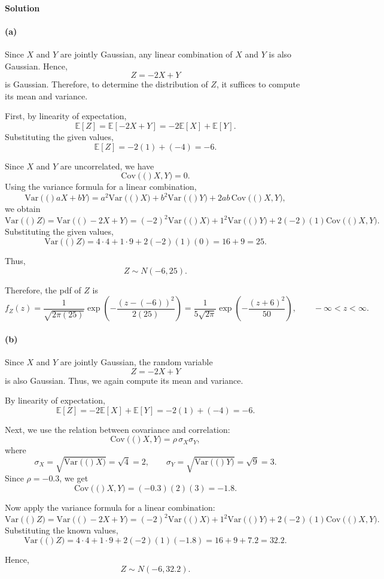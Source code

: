 \documentclass[a4paper,10pt]{article}
\newcommand{\Var}[1]{\text{Var}\left(#1\right)} %
\newcommand{\Cov}[1]{\text{Cov}\left(#1\right)} %
\begin{document}
\paragraph{Solution}
\paragraph{(a)}
Since $X$ and $Y$ are jointly Gaussian, any linear combination of $X$ and $Y$ is also Gaussian. Hence,
\[
Z=-2X+Y
\]
is Gaussian. Therefore, to determine the distribution of $Z$, it suffices to compute its mean and variance.

First, by linearity of expectation,
\[
\mathbb{E}[Z]=\mathbb{E}[-2X+Y]
=-2\mathbb{E}[X]+\mathbb{E}[Y].
\]
Substituting the given values,
\[
\mathbb{E}[Z]=-2(1)+(-4)=-6.
\]

Since $X$ and $Y$ are uncorrelated, we have
\[
\Cov(X,Y)=0.
\]
Using the variance formula for a linear combination,
\[
\Var(aX+bY)=a^2\Var(X)+b^2\Var(Y)+2ab\,\Cov(X,Y),
\]
we obtain
\[
\Var(Z)=\Var(-2X+Y)
=(-2)^2\Var(X)+1^2\Var(Y)+2(-2)(1)\Cov(X,Y).
\]
Substituting the given values,
\[
\Var(Z)=4\cdot 4+1\cdot 9+2(-2)(1)(0)=16+9=25.
\]

Thus,
\[
Z\sim N(-6,25).
\]

Therefore, the pdf of $Z$ is
\[
f_Z(z)=\frac{1}{\sqrt{2\pi(25)}}
\exp\left(-\frac{(z-(-6))^2}{2(25)}\right)
=\frac{1}{5\sqrt{2\pi}}
\exp\left(-\frac{(z+6)^2}{50}\right),
\qquad -\infty<z<\infty.
\]
\paragraph{(b)}
Since $X$ and $Y$ are jointly Gaussian, the random variable
\[
Z=-2X+Y
\]
is also Gaussian. Thus, we again compute its mean and variance.

By linearity of expectation,
\[
\mathbb{E}[Z]= -2\mathbb{E}[X]+\mathbb{E}[Y]
=-2(1)+(-4)=-6.
\]

Next, we use the relation between covariance and correlation:
\[
\Cov(X,Y)=\rho\,\sigma_X\sigma_Y,
\]
where
\[
\sigma_X=\sqrt{\Var(X)}=\sqrt{4}=2,
\qquad
\sigma_Y=\sqrt{\Var(Y)}=\sqrt{9}=3.
\]
Since $\rho=-0.3$, we get
\[
\Cov(X,Y)=(-0.3)(2)(3)=-1.8.
\]

Now apply the variance formula for a linear combination:
\[
\Var(Z)=\Var(-2X+Y)
=(-2)^2\Var(X)+1^2\Var(Y)+2(-2)(1)\Cov(X,Y).
\]
Substituting the known values,
\[
\Var(Z)=4\cdot 4+1\cdot 9+2(-2)(1)(-1.8)
=16+9+7.2=32.2.
\]

Hence,
\[
Z\sim N(-6,32.2).
\]
\end{document}
